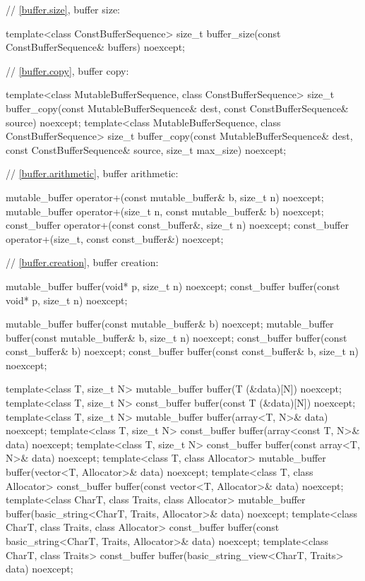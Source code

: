 \begin{codeblock}
{{{{  // \ref{buffer.size}, buffer size:

  template<class ConstBufferSequence>
    size_t buffer_size(const ConstBufferSequence& buffers) noexcept;

  // \ref{buffer.copy}, buffer copy:

  template<class MutableBufferSequence, class ConstBufferSequence>
    size_t buffer_copy(const MutableBufferSequence& dest,
                       const ConstBufferSequence& source) noexcept;
  template<class MutableBufferSequence, class ConstBufferSequence>
    size_t buffer_copy(const MutableBufferSequence& dest,
                       const ConstBufferSequence& source,
                       size_t max_size) noexcept;

  // \ref{buffer.arithmetic}, buffer arithmetic:

  mutable_buffer operator+(const mutable_buffer& b, size_t n) noexcept;
  mutable_buffer operator+(size_t n, const mutable_buffer& b) noexcept;
  const_buffer operator+(const const_buffer&, size_t n) noexcept;
  const_buffer operator+(size_t, const const_buffer&) noexcept;

  // \ref{buffer.creation}, buffer creation:

  mutable_buffer buffer(void* p, size_t n) noexcept;
  const_buffer buffer(const void* p, size_t n) noexcept;

  mutable_buffer buffer(const mutable_buffer& b) noexcept;
  mutable_buffer buffer(const mutable_buffer& b, size_t n) noexcept;
  const_buffer buffer(const const_buffer& b) noexcept;
  const_buffer buffer(const const_buffer& b, size_t n) noexcept;

  template<class T, size_t N>
    mutable_buffer buffer(T (&data)[N]) noexcept;
  template<class T, size_t N>
    const_buffer buffer(const T (&data)[N]) noexcept;
  template<class T, size_t N>
    mutable_buffer buffer(array<T, N>& data) noexcept;
  template<class T, size_t N>
    const_buffer buffer(array<const T, N>& data) noexcept;
  template<class T, size_t N>
    const_buffer buffer(const array<T, N>& data) noexcept;
  template<class T, class Allocator>
    mutable_buffer buffer(vector<T, Allocator>& data) noexcept;
  template<class T, class Allocator>
    const_buffer buffer(const vector<T, Allocator>& data) noexcept;
  template<class CharT, class Traits, class Allocator>
    mutable_buffer buffer(basic_string<CharT, Traits, Allocator>& data) noexcept;
  template<class CharT, class Traits, class Allocator>
    const_buffer buffer(const basic_string<CharT, Traits, Allocator>& data) noexcept;
  template<class CharT, class Traits>
    const_buffer buffer(basic_string_view<CharT, Traits> data) noexcept;

}}}}
\end{codeblock}
